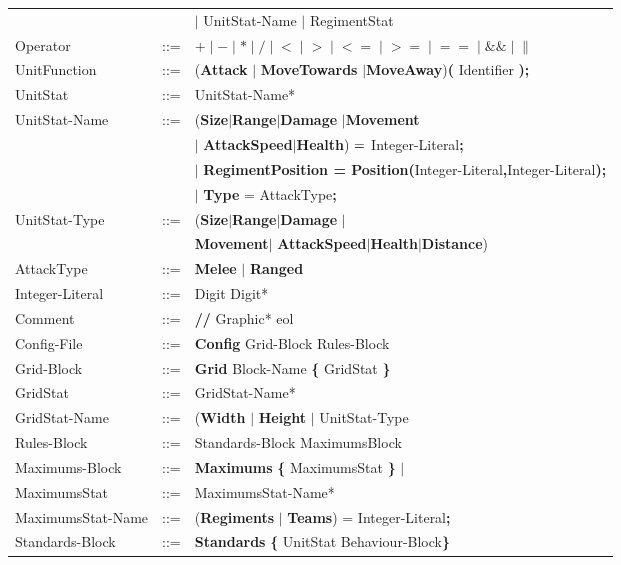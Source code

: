 \begin{center}
\begin{longtable}{ l l l }
					   &		 & $\mid$ UnitStat-Name $\mid$ RegimentStat \\	
	Operator 		   & 	::=	 & $\boldsymbol {+} \mid \boldsymbol {-} \mid  \boldsymbol {*}\mid 
									\boldsymbol {/} \mid \boldsymbol {<} \mid  \boldsymbol {>} \mid
									\boldsymbol {<=} \mid  \boldsymbol {>=} \mid \boldsymbol {==} 
									\mid \boldsymbol {\&\&} \mid \boldsymbol {\|}$\\
	UnitFunction	   &	::=	 & ({\bf Attack} $\mid$ {\bf MoveTowards} $\mid${\bf MoveAway}){\bf (} Identifier {\bf );}\\
	UnitStat		   &	::=  & UnitStat-Name*\\
	UnitStat-Name	   &	::=	 & ({\bf Size}$\mid${\bf Range}$\mid${\bf Damage} $\mid${\bf Movement}\\ 
					   &		 & $\mid$ {\bf AttackSpeed}$\mid${\bf Health}) ${\bf = }$ Integer-Literal{\bf ;} \\
					   &	     & $\mid$ {\bf RegimentPosition = Position(}Integer-Literal{\bf ,}Integer-Literal{\bf );}\\
					   &		 & $\mid$ {\bf Type} = AttackType{\bf ;}\\
	UnitStat-Type	   &	::=  & ({\bf Size}$\mid${\bf Range}$\mid${\bf Damage} $\mid$\\
					   &	     & {\bf Movement}$\mid$ {\bf AttackSpeed}$\mid${\bf Health}$\mid${\bf Distance})\\ 
	AttackType		   &    ::=  & {\bf Melee} $\mid$ {\bf Ranged} \\
	Integer-Literal    &	::=  & Digit Digit*\\
	Comment			   &    ::=  & {\bf //} Graphic* eol\\
	Config-File		   & 	::=  & {\bf Config} Grid-Block Rules-Block  		\\
	Grid-Block		   &	::=	 & {\bf Grid} Block-Name	 {\bf \{} GridStat \bf{\}} \\
	GridStat		   &	::=  & GridStat-Name*\\	
	GridStat-Name	   &	::=  & ({\bf Width} $\mid$ {\bf Height} $\mid$ UnitStat-Type\\	
	Rules-Block		   &	::=	 & Standards-Block MaximumsBlock 				\\
	Maximums-Block	   &	::=	 & {\bf Maximums} {\bf \{} MaximumsStat {\bf \}} $\mid$ \\
	MaximumsStat	   &	::=  & MaximumsStat-Name*\\
	MaximumsStat-Name  &	::=  & ({\bf Regiments }$\mid$ {\bf Teams}) =  Integer-Literal{\bf ;}\\		 
	Standards-Block	   &    ::=  & {\bf Standards} {\bf \{ } UnitStat Behaviour-Block\bf{\} }		\\
			\end{longtable}
		\end{center}					     